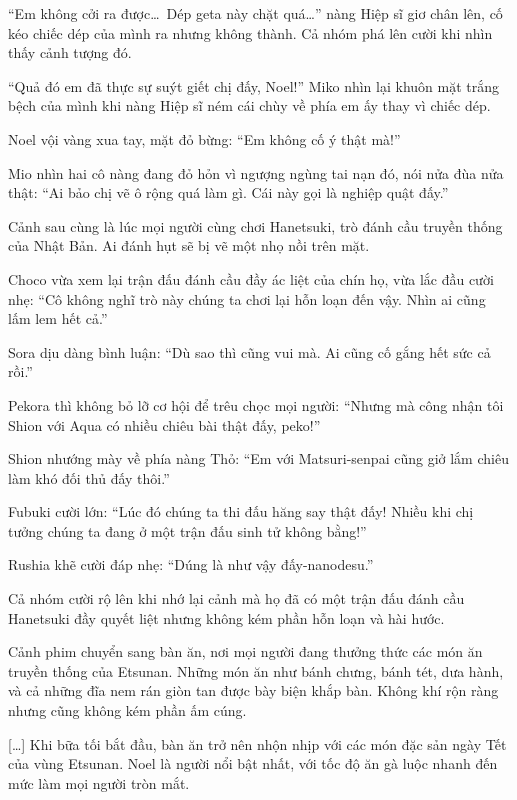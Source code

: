 \documentclass[../main.tex]{subfiles}
\begin{document}
``Em không cởi ra được\dots\ Dép geta này chặt quá\dots'' nàng Hiệp sĩ giơ chân lên, cố kéo chiếc dép của mình ra nhưng không thành. Cả nhóm phá lên cười khi nhìn thấy cảnh tượng đó.

\il

``Quả đó em đã thực sự suýt giết chị đấy, Noel!'' Miko nhìn lại khuôn mặt trắng bệch của mình khi nàng Hiệp sĩ ném cái chùy về phía em ấy thay vì chiếc dép.

Noel vội vàng xua tay, mặt đỏ bừng: ``Em không cố ý thật mà!''

Mio nhìn hai cô nàng đang đỏ hỏn vì ngượng ngùng tai nạn đó, nói nửa đùa nửa thật: ``Ai bảo chị vẽ ô rộng quá làm gì. Cái này gọi là nghiệp quật đấy.''

Cảnh sau cùng là lúc mọi người cùng chơi Hanetsuki, trò đánh cầu truyền thống của Nhật Bản. Ai đánh hụt sẽ bị vẽ một nhọ nồi trên mặt.

Choco vừa xem lại trận đấu đánh cầu đầy ác liệt của chín họ, vừa lắc đầu cười nhẹ: ``Cô không nghĩ trò này chúng ta chơi lại hỗn loạn đến vậy. Nhìn ai cũng lấm lem hết cả.''

Sora dịu dàng bình luận: ``Dù sao thì cũng vui mà. Ai cũng cố gắng hết sức cả rồi.''

Pekora thì không bỏ lỡ cơ hội để trêu chọc mọi người: ``Nhưng mà công nhận tôi Shion với Aqua có nhiều chiêu bài thật đấy, peko!''

Shion nhướng mày về phía nàng Thỏ: ``Em với Matsuri-senpai cũng giở lắm chiêu làm khó đối thủ đấy thôi.''

Fubuki cười lớn: ``Lúc đó chúng ta thi đấu hăng say thật đấy! Nhiều khi chị tưởng chúng ta đang ở một trận đấu sinh tử không bằng!''

Rushia khẽ cười đáp nhẹ: ``Dúng là như vậy đấy-nanodesu.''

Cả nhóm cười rộ lên khi nhớ lại cảnh mà họ đã có một trận đấu đánh cầu Hanetsuki đầy quyết liệt nhưng không kém phần hỗn loạn và hài hước.

Cảnh phim chuyển sang bàn ăn, nơi mọi người đang thưởng thức các món ăn truyền thống của Etsunan. Những món ăn như bánh chưng, bánh tét, dưa hành, và cả những đĩa nem rán giòn tan được bày biện khắp bàn. Không khí rộn ràng nhưng cũng không kém phần ấm cúng.

\il

[\dots] Khi bữa tối bắt đầu, bàn ăn trở nên nhộn nhịp với các món đặc sản ngày Tết của vùng Etsunan. Noel là người nổi bật nhất, với tốc độ ăn gà luộc nhanh đến mức làm mọi người tròn mắt.
\end{document}
